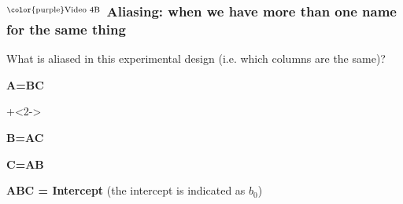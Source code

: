 \documentclass[handout,11pt,aspectratio=169,mathserif]{beamer}
\begin{document}
\begin{frame}\frametitle{$^\text{\color{purple}Video 4B}$ Aliasing: when we have more than one name for the same thing}
	
	\vspace{1cm}
	What is aliased in this experimental design (i.e. which columns are the same)?
		
		\vspace{0.5cm}
		\begin{itemize}
			\item	\textbf{A=BC}
			
			\onslide+<2->	{
			\vspace{1cm}
			\item	\textbf{B=AC}
			
			\vspace{1cm}
			\item	\textbf{C=AB} 
			
			\vspace{1cm}
			\item	\textbf{ABC = Intercept} (the intercept is indicated as $b_0$)
			}
		\end{itemize}

\end{frame}
\end{document}
